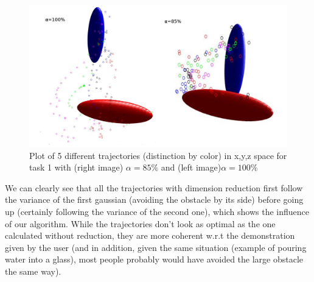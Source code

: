 \documentclass[letterpaper, 10 pt, conference]{ieeeconf}  %
\begin{document}
\begin{figure}[h]
	\centering
	\includegraphics[scale=0.16]{figure/plotMixedTask1.png}
	\caption{Plot of 5 different trajectories (distinction by color) in x,y,z space for task 1 with (right image) $\alpha = 85\%$ and (left image)$\alpha = 100\%$ }
	\label{trajectoriesTask1}
\end{figure}
We can clearly see that all the trajectories with dimension reduction first follow the variance of the first gaussian (avoiding the obstacle by its side) before going up (certainly following the variance of the second one), which shows the influence of our algorithm. While the trajectories don't look as optimal as the one calculated without reduction, they are more coherent w.r.t the demonstration given by the user (and in addition, given the same situation (example of pouring water into a glass), most people probably would have avoided the large obstacle the same way). \\
\end{document}
